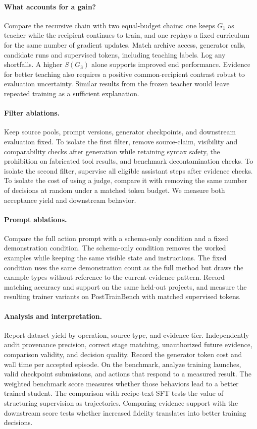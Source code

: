 \documentclass{article}
\begin{document}
\paragraph{What accounts for a gain?}
Compare the recursive chain with two equal-budget chains: one keeps \(G_1\) as teacher while the recipient continues to train, and one replays a fixed curriculum for the same number of gradient updates. Match archive access, generator calls, candidate runs and supervised tokens, including teaching labels. Log any shortfalls. A higher \(S(G_3)\) alone supports improved end performance. Evidence for better teaching also requires a positive common-recipient contrast robust to evaluation uncertainty. Similar results from the frozen teacher would leave repeated training as a sufficient explanation.

\paragraph{Filter ablations.}
Keep source pools, prompt versions, generator checkpoints, and downstream evaluation fixed. To isolate the first filter, remove source-claim, visibility and comparability checks after generation while retaining syntax safety, the prohibition on fabricated tool results, and benchmark decontamination checks. To isolate the second filter, supervise all eligible assistant steps after evidence checks. To isolate the cost of using a judge, compare it with removing the same number of decisions at random under a matched token budget. We measure both acceptance yield and downstream behavior.

\paragraph{Prompt ablations.}
Compare the full action prompt with a schema-only condition and a fixed demonstration condition. The schema-only condition removes the worked examples while keeping the same visible state and instructions. The fixed condition uses the same demonstration count as the full method but draws the example types without reference to the current evidence pattern. Record matching accuracy and support on the same held-out projects, and measure the resulting trainer variants on PostTrainBench with matched supervised tokens.

\paragraph{Analysis and interpretation.}
Report dataset yield by operation, source type, and evidence tier. Independently audit provenance precision, correct stage matching, unauthorized future evidence, comparison validity, and decision quality. Record the generator token cost and wall time per accepted episode. On the benchmark, analyze training launches, valid checkpoint submissions, and actions that respond to a measured result. The weighted benchmark score measures whether those behaviors lead to a better trained student. The comparison with recipe-text SFT tests the value of structuring supervision as trajectories. Comparing evidence support with the downstream score tests whether increased fidelity translates into better training decisions.
\end{document}
